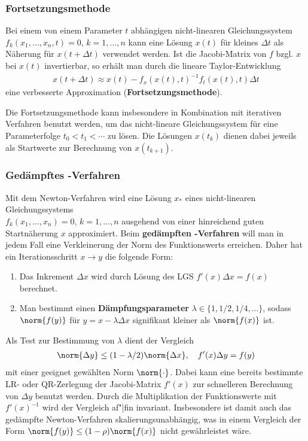 \pagebreak

\subsubsection{%
    Fortsetzungsmethode%
}

Bei einem von einem Parameter $t$ abhängigen nicht-linearen Gleichungssystem \\
$f_k(x_1, \dotsc, x_n, t) = 0$, $k = 1, \dotsc, n$
kann eine Lösung $x(t)$ für kleines $\Delta t$ als Näherung für
$x(t + \Delta t)$ verwendet werden.
Ist die Jacobi-Matrix von $f$ bzgl. $x$ bei $x(t)$ invertierbar,
so erhält man durch die lineare Taylor-Entwicklung
\begin{align*}
    x(t + \Delta t) \approx x(t) - f_x(x(t), t)^{-1} f_t(x(t), t) \Delta t
\end{align*}
eine verbesserte Approximation (\textbf{Fortsetzungsmethode}).

Die Fortsetzungsmethode kann insbesondere in Kombination mit iterativen
Verfahren benutzt werden, um das nicht-lineare Gleichungssystem für eine
Parameterfolge $t_0 < t_1 < \dotsb$ zu lösen.
Die Lösungen $x(t_k)$ dienen dabei jeweils als Startwerte zur Berechnung
von $x(t_{k+1})$.

\subsubsection{%
    Gedämpftes -Verfahren%
}

Mit dem Newton-Verfahren wird eine Lösung $x_\ast$ eines nicht-linearen
Gleichungssystems \\
$f_k(x_1, \dotsc, x_n) = 0$, $k = 1, \dotsc, n$
ausgehend von einer hinreichend guten Startnäherung $x$ approximiert.
Beim \textbf{gedämpften -Verfahren} will man in jedem Fall eine
Verkleinerung der Norm des Funktionswerts erreichen.
Daher hat ein Iterationsschritt $x \rightarrow y$ die folgende Form:
\begin{enumerate}
    \item
    Das Inkrement $\Delta x$ wird durch Lösung des LGS
    $f'(x) \Delta x = f(x)$ berechnet.

    \item
    Man bestimmt einen \textbf{Dämpfungsparameter}
    $\lambda \in \{1, 1/2, 1/4, \dotsc\}$, sodass $\norm{f(y)}$
    für $y = x - \lambda \Delta x$ signifikant kleiner als $\norm{f(x)}$ ist.
\end{enumerate}

Als Test zur Bestimmung von $\lambda$ dient der Vergleich
\begin{align*}
    \norm{\Delta y} \le (1 - \lambda/2) \norm{\Delta x}, \quad
    f'(x) \Delta y = f(y)
\end{align*}
mit einer geeignet gewählten Norm $\norm{\cdot}$.
Dabei kann eine bereits bestimmte LR- oder QR-Zerlegung der Jacobi-Matrix
$f'(x)$ zur schnelleren Berechnung von $\Delta y$ benutzt werden.
Durch die Multiplikation der Funktionswerte mit $f'(x)^{-1}$ wird der Vergleich
af"|fin invariant.
Insbesondere ist damit auch das gedämpfte Newton-Verfahren
skalierungsunabhängig, was in einem Vergleich der Form
$\norm{f(y)} \le (1 - \rho) \norm{f(x)}$ nicht gewährleistet wäre.

